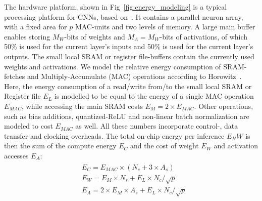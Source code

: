 \documentclass[article,10pt]{IEEEtran}
\begin{document}
The hardware platform, shown in Fig~\ref{fig:energy_modeling} is a typical processing platform for CNNs, based on~\cite{moons2017envision}. It contains a parallel neuron array, with a fixed area for $p$ MAC-units and two levels of memory. A large main buffer enables storing $M_W$-bits of weights and $M_A=M_{W}$-bits of activations, of which 50\% is used for the current layer's inputs and 50\% is used for the current layer's outputs. The small local SRAM or register file-buffers contain the currently used weights and activations. 
We model the relative energy consumption of SRAM-fetches and Multiply-Accumulate (MAC) operations according to Horowitz~\cite{Horowitz}. Here, the energy consumption of a read/write from/to the small local SRAM or Register file $E_{L}$ is modelled to be equal to the energy of a single MAC operation $E_{MAC}$, while accessing the main SRAM costs $E_{M}=2\times E_{MAC}$. Other operations, such as bias additions, quantized-ReLU and non-linear batch normalization are modeled to cost $E_{MAC}$ as well. All these numbers incorporate control-, data transfer and clocking overheads.
The total on-chip energy per inference $E_HW$ is then the sum of the compute energy $E_{C}$ and the cost of weight $E_{W}$ and activation accesses $E_{A}$:
\begin{align}
\begin{split} 
 &E_{C} = E_{MAC} \times ( N_{c} + 3\times A_s) \\ 
 &E_{W} = E_{M} \times N_{s} + E_{L} \times N_{c} / \sqrt p \\
 &E_{A} = 2 \times E_{M} \times A_{s} + E_{L} \times N_{c}/ \sqrt p 
 \end{split}
\end{align}
\end{document}
